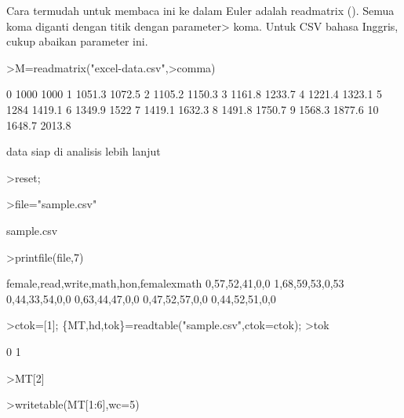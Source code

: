 \documentclass[a4paper,10pt]{article}
\begin{document}
\begin{eulernotebook}
\begin{eulercomment}
\begin{eulercomment}
\begin{eulercomment}
\begin{eulercomment}
\begin{eulercomment}
\begin{eulercomment}
\begin{eulercomment}
\begin{eulercomment}
\begin{eulercomment}
Cara termudah untuk membaca ini ke dalam Euler adalah readmatrix ().
Semua koma diganti dengan titik dengan parameter\textgreater{} koma. Untuk CSV
bahasa Inggris, cukup abaikan parameter ini.
\end{eulercomment}
\begin{eulerprompt}
>M=readmatrix("excel-data.csv",>comma)
\end{eulerprompt}
\begin{euleroutput}
          0      1000      1000 
          1    1051.3    1072.5 
          2    1105.2    1150.3 
          3    1161.8    1233.7 
          4    1221.4    1323.1 
          5      1284    1419.1 
          6    1349.9      1522 
          7    1419.1    1632.3 
          8    1491.8    1750.7 
          9    1568.3    1877.6 
         10    1648.7    2013.8 
\end{euleroutput}
\begin{eulercomment}
data siap di analisis lebih lanjut
\end{eulercomment}
\begin{eulerprompt}
>reset;
\end{eulerprompt}
\begin{eulerprompt}
>file="sample.csv"
\end{eulerprompt}
\begin{euleroutput}
  sample.csv
\end{euleroutput}
\begin{eulerprompt}
>printfile(file,7)
\end{eulerprompt}
\begin{euleroutput}
  female,read,write,math,hon,femalexmath
  0,57,52,41,0,0
  1,68,59,53,0,53
  0,44,33,54,0,0
  0,63,44,47,0,0
  0,47,52,57,0,0
  0,44,52,51,0,0
\end{euleroutput}
\begin{eulerprompt}
>ctok=[1]; \{MT,hd,tok\}=readtable("sample.csv",ctok=ctok);
>tok
\end{eulerprompt}
\begin{euleroutput}
  0
  1
\end{euleroutput}
\begin{eulerprompt}
>MT[2]
\end{eulerprompt}
\begin{euleroutput}
  [2,  68,  59,  53,  0,  53]
\end{euleroutput}
\begin{eulerprompt}
>writetable(MT[1:6],wc=5)
\end{eulerprompt}

\end{eulercomment}
\end{eulercomment}
\end{eulercomment}
\end{eulercomment}
\end{eulercomment}
\end{eulercomment}
\end{eulercomment}
\end{eulercomment}
\end{eulernotebook}
\end{document}
